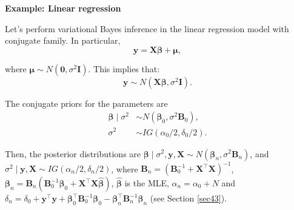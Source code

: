 \textbf{Example: Linear regression}

Let's perform variational Bayes inference in the linear regression model with conjugate family. In particular, 
\[
\boldsymbol{y} = \boldsymbol{X} \boldsymbol{\beta} + \boldsymbol{\mu},
\]

where \( \boldsymbol{\mu} \sim N(\boldsymbol{0}, \sigma^2 \boldsymbol{I}) \). This implies that:
\[
\boldsymbol{y} \sim N(\boldsymbol{X} \boldsymbol{\beta}, \sigma^2 \boldsymbol{I}).\] 

The conjugate priors for the parameters are
\begin{align*}
	\boldsymbol{\beta}\mid \sigma^2 & \sim N(\boldsymbol{\beta}_0, \sigma^2 {\boldsymbol{B}}_0),\\
	\sigma^2 & \sim IG(\alpha_0/2, \delta_0/2).
\end{align*}

Then, the posterior distributions are $\boldsymbol{\beta}\mid \sigma^2, \boldsymbol{y}, \boldsymbol{X} \sim N(\boldsymbol{\beta}_n, \sigma^2\boldsymbol{B}_n)$, and 	$\sigma^2\mid  \boldsymbol{y}, \boldsymbol{X}\sim IG(\alpha_n/2, \delta_n/2)$, where $\boldsymbol{B}_n = (\boldsymbol{B}_0^{-1} + \boldsymbol{X}^{\top}\boldsymbol{X})^{-1}$, $\boldsymbol{\beta}_n = \boldsymbol{B}_n(\boldsymbol{B}_0^{-1}\boldsymbol{\beta}_0 + \boldsymbol{X}^{\top}\boldsymbol{X}\hat{\boldsymbol{\beta}})$, $\hat{\boldsymbol{\beta}}$ is the MLE, $\alpha_n = \alpha_0 + N$ and $\delta_n = \delta_0 + \boldsymbol{y}^{\top}\boldsymbol{y} + \boldsymbol{\beta}_0^{\top}\boldsymbol{B}_0^{-1}\boldsymbol{\beta}_0 - \boldsymbol{\beta}_n^{\top}\boldsymbol{B}_n^{-1}\boldsymbol{\beta}_n$ (see Section \ref{sec43}).

